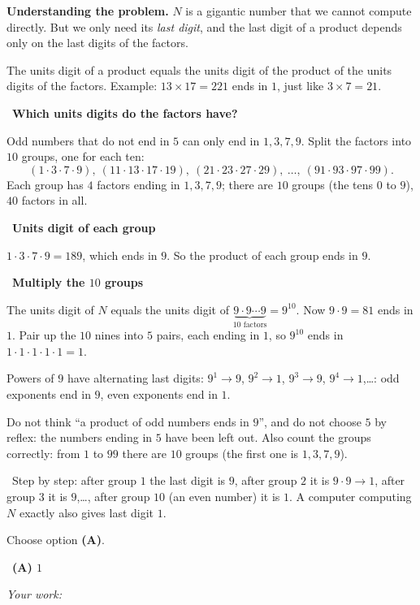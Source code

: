 \documentclass[11pt]{article}
\newif\ifsol \solfalse
\providecommand{\AnsWord}{Đáp số}
\newcommand{\ans}[1]{\par\smallskip{\bfseries\color{tmGreen!88!black}\AnsWord:}\ {\bfseries\color{AnsRed}#1}\par}
\newcommand{\probsol}[1]{%
  \begin{lrbox}{\solmeasure}\begin{minipage}{\dimexpr\linewidth-24pt\relax}#1\end{minipage}\end{lrbox}%
  \ifsol
    \begin{solbox}#1\end{solbox}%
  \else
    \setlength{\solht}{\dimexpr\ht\solmeasure+\dp\solmeasure+0.85cm\relax}%
    \ifdim\solht<1.35cm\setlength{\solht}{1.35cm}\fi
    \ifdim\solht>\StudentMaxWork\setlength{\solht}{\StudentMaxWork}\fi
    \begin{tcolorbox}[colback=white,colframe=Line,boxrule=0.8pt,arc=5pt,
      left=8pt,right=8pt,top=4pt,bottom=4pt,height=\solht]{\footnotesize\color{Slate}\itshape\WorkWord}\end{tcolorbox}%
  \fi}
\newlength{\StudentMaxWork}\setlength{\StudentMaxWork}{7.5cm}
\newcommand{\step}[2]{\par\smallskip\noindent{\bfseries\color{tmBlue!85!black}\StepWord~#1.}\ {\bfseries #2}\par\nopagebreak}
\newcommand{\verify}[1]{\par\smallskip\noindent{\bfseries\color{tmGreen!80!black}\faCheckCircle\ \CheckWord}\ #1\par}
\def\WorkWord{Your work:}
\def\AnsWord{Answer}
\def\StepWord{Step}
\def\CheckWord{Check:}
\begin{document}
\probsol{
\textbf{Understanding the problem.} $N$ is a gigantic number that we cannot compute directly. But we only need its \emph{last digit}, and the last digit of a product depends only on the last digits of the factors.

\begin{recallbox}The units digit of a product equals the units digit of the product of the units digits of the factors. Example: $13\times 17=221$ ends in $1$, just like $3\times 7=21$.\end{recallbox}

\step{1}{Which units digits do the factors have?}
Odd numbers that do not end in $5$ can only end in $1,3,7,9$. Split the factors into $10$ groups, one for each ten:
\[(1\cdot3\cdot7\cdot9),\ (11\cdot13\cdot17\cdot19),\ (21\cdot23\cdot27\cdot29),\ \dots,\ (91\cdot93\cdot97\cdot99).\]
Each group has $4$ factors ending in $1,3,7,9$; there are $10$ groups (the tens $0$ to $9$), $40$ factors in all.

\step{2}{Units digit of each group}
$1\cdot3\cdot7\cdot9=189$, which ends in $9$. So the product of each group ends in $9$.

\step{3}{Multiply the $10$ groups}
The units digit of $N$ equals the units digit of $\underbrace{9\cdot 9\cdots 9}_{10\text{ factors}}=9^{10}$. Now $9\cdot 9=81$ ends in $1$. Pair up the $10$ nines into $5$ pairs, each ending in $1$, so $9^{10}$ ends in $1\cdot1\cdot1\cdot1\cdot1=1$.

\begin{tipbox}Powers of $9$ have alternating last digits: $9^1\to 9$, $9^2\to 1$, $9^3\to 9$, $9^4\to 1$,\dots: odd exponents end in $9$, even exponents end in $1$.\end{tipbox}

\begin{warnbox}Do not think ``a product of odd numbers ends in $9$'', and do not choose $5$ by reflex: the numbers ending in $5$ have been left out. Also count the groups correctly: from $1$ to $99$ there are $10$ groups (the first one is $1,3,7,9$).\end{warnbox}

\verify{Step by step: after group $1$ the last digit is $9$, after group $2$ it is $9\cdot9\to1$, after group $3$ it is $9$,\dots, after group $10$ (an even number) it is $1$. A computer computing $N$ exactly also gives last digit $1$.}
Choose option \textbf{(A)}.
\ans{(A) $1$}
}
\end{document}
